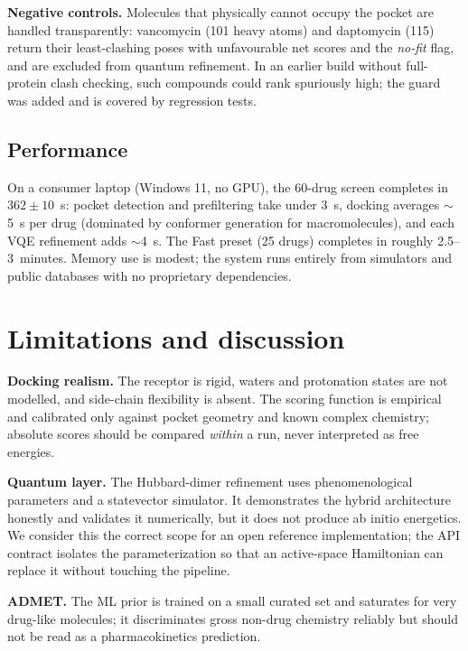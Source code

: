 \documentclass[10pt,a4paper,twocolumn]{article}
\begin{document}
\textbf{Negative controls.} Molecules that physically cannot occupy the pocket are
handled transparently: vancomycin (101 heavy atoms) and daptomycin (115) return their
least-clashing poses with unfavourable net scores and the \emph{no-fit} flag, and are
excluded from quantum refinement. In an earlier build without full-protein clash
checking, such compounds could rank spuriously high; the guard was added and is covered
by regression tests.

\subsection{Performance}

On a consumer laptop (Windows 11, no GPU), the 60-drug screen completes in
$362\pm10$~s: pocket detection and prefiltering take under 3~s, docking averages
$\sim$5~s per drug (dominated by conformer generation for macromolecules), and each VQE
refinement adds $\sim$4~s. The Fast preset (25 drugs) completes in roughly
2.5--3~minutes. Memory use is modest; the system runs entirely from simulators and
public databases with no proprietary dependencies.

\section{Limitations and discussion}

\textbf{Docking realism.} The receptor is rigid, waters and protonation states are not
modelled, and side-chain flexibility is absent. The scoring function is empirical and
calibrated only against pocket geometry and known complex chemistry; absolute scores
should be compared \emph{within} a run, never interpreted as free energies.

\textbf{Quantum layer.} The Hubbard-dimer refinement uses phenomenological parameters
and a statevector simulator. It demonstrates the hybrid architecture honestly and
validates it numerically, but it does not produce ab initio energetics. We consider this
the correct scope for an open reference implementation; the API contract isolates the
parameterization so that an active-space Hamiltonian can replace it without touching the
pipeline.

\textbf{ADMET.} The ML prior is trained on a small curated set and saturates for very
drug-like molecules; it discriminates gross non-drug chemistry reliably but should not
be read as a pharmacokinetics prediction.
\end{document}
